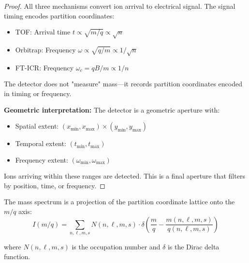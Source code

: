 \begin{proof}
All three mechanisms convert ion arrival to electrical signal. The signal timing encodes partition coordinates:
\begin{itemize}
    \item TOF: Arrival time $t \propto \sqrt{m/q} \propto \sqrt{n}$
    \item Orbitrap: Frequency $\omega \propto \sqrt{q/m} \propto 1/\sqrt{n}$
    \item FT-ICR: Frequency $\omega_c = qB/m \propto 1/n$
\end{itemize}

The detector does not "measure" mass—it records partition coordinates encoded in timing or frequency.

\textbf{Geometric interpretation:} The detector is a geometric aperture with:
\begin{itemize}
    \item Spatial extent: $(x_{\min}, x_{\max}) \times (y_{\min}, y_{\max})$
    \item Temporal extent: $(t_{\min}, t_{\max})$
    \item Frequency extent: $(\omega_{\min}, \omega_{\max})$
\end{itemize}

Ions arriving within these ranges are detected. This is a final aperture that filters by position, time, or frequency.
\end{proof}

\begin{corollary}
\label{cor:spectrum_projection}
The mass spectrum is a projection of the partition coordinate lattice onto the $m/q$ axis:
\begin{equation}
I(m/q) = \sum_{n,\ell,m,s} N(n,\ell,m,s) \cdot \delta\left(\frac{m}{q} - \frac{m(n,\ell,m,s)}{q(n,\ell,m,s)}\right)
\end{equation}

where $N(n,\ell,m,s)$ is the occupation number and $\delta$ is the Dirac delta function.
\end{corollary}

